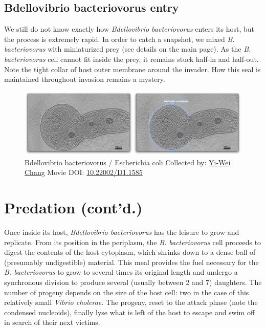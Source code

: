 \documentclass[]{tufte-book}
\begin{document}
\hypertarget{Bdellovibrio_bacteriovorus_entry}{\subsection{Bdellovibrio
bacteriovorus entry}\label{Bdellovibrio_bacteriovorus_entry}}

We still do not know exactly how \emph{Bdellovibrio bacteriovorus}
enters its host, but the process is extremely rapid. In order to catch a
snapshot, we mixed \emph{B. bacteriovorus} with miniaturized prey (see
details on the main page). As the \emph{B. bacteriovorus} cell cannot
fit inside the prey, it remains stuck half-in and half-out. Note the
tight collar of host outer membrane around the invader. How this seal is
maintained throughout invasion remains a mystery.





\begin{figure}
\includegraphics{movie_stills/9_10a} \caption[Bdellovibrio bacteriovorus / Escherichia coli Collected by:
\protect\hyperlink{yi-wei_chang}{Yi-Wei Chang} Movie DOI:
\href{https://doi.org/10.22002/D1.1585}{10.22002/D1.1585}]{Bdellovibrio bacteriovorus / Escherichia coli Collected by:
\protect\hyperlink{yi-wei_chang}{Yi-Wei Chang} Movie DOI:
\href{https://doi.org/10.22002/D1.1585}{10.22002/D1.1585}}\label{fig:9-10a}
\end{figure}

\section{Predation (cont'd.)}\label{predation-contd.-1}

Once inside its host, \emph{Bdellovibrio bacteriovorus} has the leisure
to grow and replicate. From its position in the periplasm, the \emph{B.
bacteriovorus} cell proceeds to digest the contents of the host
cytoplasm, which shrinks down to a dense ball of (presumably
undigestible) material. This meal provides the fuel necessary for the
\emph{B. bacteriovorus} to grow to several times its original length and
undergo a synchronous division to produce several (usually between 2 and
7) daughters. The number of progeny depends on the size of the host
cell: two in the case of this relatively small \emph{Vibrio cholerae}.
The progeny, reset to the attack phase (note the condensed nucleoids),
finally lyse what is left of the host to escape and swim off in search
of their next victims.
\end{document}
